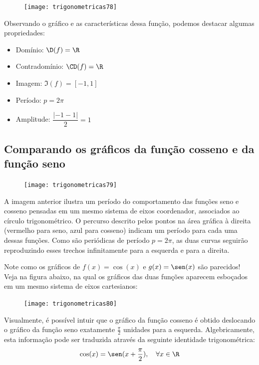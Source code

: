 \begin{figure}[H]
\centering

\texttt{[image: trigonometricas78]}
\end{figure}

Observando o gráfico e as características dessa função, podemos destacar algumas propriedades:
\begin{itemize}
\item Domínio: $\D(f)=\R$
\item Contradomínio: $\CD(f)=\R$
\item Imagem: $\Im(f)=[-1,1]$
\item Período: $p=2\pi$
\item Amplitude: $\dfrac{|-1-1|}{2}=1$
\end{itemize}

\subsection{Comparando os gráficos da função cosseno e da função seno}

\begin{figure}[H]
\centering

\texttt{[image: trigonometricas79]}
\end{figure}

A imagem anterior ilustra um período do comportamento das funções seno e cosseno pensadas em um mesmo sistema de eixos coordenador, associados ao círculo trigonométrico. O percurso descrito pelos pontos na área gráfica à direita (vermelho para seno, azul para cosseno) indicam um período para cada uma dessas funções. Como são periódicas de período $p=2\pi$, as duas curvas seguirão reproduzindo esses trechos infinitamente para a esquerda e para a direita.

Note como os gráficos de $f(x) = \cos(x)$ e $g(x) = \sen(x)$ são parecidos! Veja na figura abaixo, na qual os gráficos das duas funções aparecem esboçados em um mesmo sistema de eixos cartesianos:

\begin{figure}[H]
\centering

\texttt{[image: trigonometricas80]}
\end{figure}

Visualmente, é possível intuir que o gráfico da função cosseno é obtido deslocando o gráfico da função seno exatamente $\frac{\pi}{2}$ unidades para a esquerda. Algebricamente, esta informação pode ser traduzida através da seguinte identidade trigonométrica:
\begin{equation*}
\cos(x)=\sen(x+\frac{\pi}{2}),\quad\forall x\in\R
\end{equation*}

